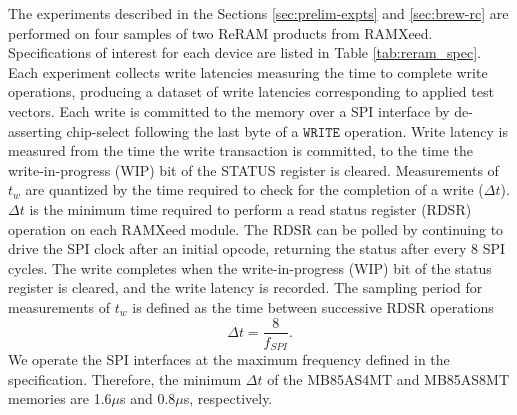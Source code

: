 The experiments described in the Sections \ref{sec:prelim-expts} and \ref{sec:brew-rc} are performed on four samples of two ReRAM products from RAMXeed. Specifications of interest for each device are listed in Table \ref{tab:reram_spec}.
Each experiment collects write latencies measuring the time to complete write operations, producing a dataset of write latencies corresponding to applied test vectors.
Each write is committed to the memory over a SPI interface by de-asserting chip-select following the last byte of a $\texttt{WRITE}$ operation. Write latency is measured from the time the write transaction is committed, to the time the write-in-progress (WIP) bit of the STATUS register is cleared. Measurements of $t_w$ are quantized by the time required to check for the completion of a write ($\Delta t$). 
$\Delta t$ is the minimum time required to perform a read status register (RDSR) operation on each RAMXeed module. The RDSR can be polled by continuing to drive the SPI clock after an initial opcode, returning the status after every 8 SPI cycles.
The write completes when the write-in-progress (WIP) bit of the status register is cleared, and the write latency is recorded. The sampling period for measurements of $t_w$ is defined as the time between successive RDSR operations
$$ \Delta t = \frac{8}{f_{SPI}}.$$
We operate the SPI interfaces at the maximum frequency defined in the specification. Therefore, the minimum $\Delta t$ of the MB85AS4MT and MB85AS8MT memories are 1.6$\mu$s and 0.8$\mu$s, respectively.

